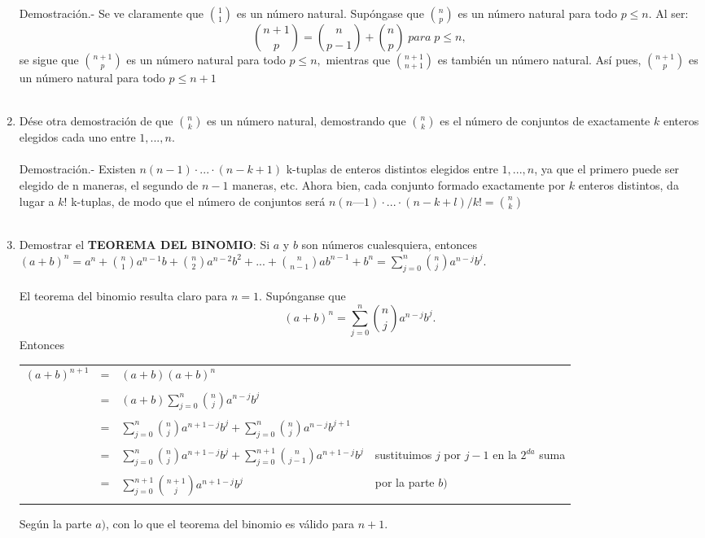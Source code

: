 \begin{teo}
\begin{enumerate}[\bfseries a)]
Demostración.- \; Se ve claramente que ${1 \choose 1}$ es un número natural. Supóngase que ${n \choose p}$ es un número natural para todo $p \leq n$. Al ser: $${ n+1 \choose p } = {n \choose p-1} + {n \choose p} \; para \; p \leq n,$$ se sigue que ${n+1 \choose p}$ es un número natural para todo $p \leq n,$ mientras que ${n+1 \choose n+1}$ es también un número natural. Así pues, ${n+1 \choose p}$ es un número natural para todo $p \leq n+1$\\\\

\item Dése otra demostración de que ${n \choose k}$ es un número natural, demostrando que ${n \choose k}$ es el número de conjuntos de exactamente $k$ enteros elegidos cada uno entre $1,...,n$.\\\\
Demostración.- \; Existen $n(n -1) \cdot ... \cdot (n - k + 1)$ k-tuplas de enteros distintos elegidos entre $1, ..., n$, ya que el primero puede ser elegido de n maneras, el segundo de $n - 1$ maneras, etc. Ahora bien, cada conjunto formado exactamente por $k$ enteros distintos, da lugar a $k!$ k-tuplas, de
modo que el número de conjuntos será $n(n — 1) \cdot ... \cdot (n - k + l)/k! = {n\choose k}$\\\\ 

\item Demostrar el \textbf{TEOREMA DEL BINOMIO}: Si $a$ \; y \; $b$ son números cualesquiera, entonces
$(a+b)^n = a^n + {n \choose 1} a^{n-1} b + {n \choose 2} a^{n-2} b^2 + ... + {n \choose n-1} a b^{n-1} + b^n = \displaystyle \sum_{j=0}^n {n \choose j} a^{n-j} b^j.$\\\\
El teorema del binomio resulta claro para $n=1.$ Supónganse que $$(a+b)^n = \displaystyle \sum_{j=0}^n {n \choose j} a^{n-j} b^j.$$
Entonces 
\begin{center}
\begin{tabular}{r c l l}
$(a+b)^{n+1}$&=&$(a+b)(a+b)^n$&\\\\
&=&$(a+b) \displaystyle \sum_{j=0}^n {n \choose j} a^{n-j} b^j$&\\\\
&=&$\displaystyle \sum_{j=0}^n {n \choose j} a^{n+1-j} b^j + \sum_{j=0}^{n} {n \choose j} a^{n-j} b^{j+1}$&\\\\
&=&$\displaystyle \sum_{j=0}^n {n \choose j} a^{n+1-j} b^j + \sum_{j=0}^{n+1} {n \choose j-1} a^{n+1-j} b^{j}$&sustituimos $j$ por $j-1$ en la $2^{da}$ suma\\\\
&=&$\displaystyle \sum_{j=0}^{n+1} {n+1 \choose j} a^{n+1-j} b^j$& por la parte $b)$\\\\
\end{tabular}
\end{center}
Según la parte $a)$, con lo que el teorema del binomio es válido para $n+1.$\\\\


\end{enumerate}
\end{teo}
